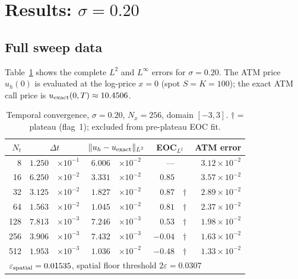 \documentclass[11pt,a4paper]{article}
\newcommand{\Nx}{N_x}
\newcommand{\Nt}{N_t}
\newcommand{\dt}{\Delta t}
\newcommand{\eps}{\varepsilon}
\begin{document}
\section{Results: \texorpdfstring{$\sigma = 0.20$}{sigma=0.20}}

\subsection{Full sweep data}

Table~\ref{tab:sigma020} shows the complete $L^2$ and
$L^\infty$ errors for $\sigma=0.20$.
The ATM price $u_h(0)$ is evaluated at the log-price $x=0$
(spot $S = K = 100$); the exact ATM call price is
$u_{\rm exact}(0,T) \approx 10.4506$.

\begin{table}[htbp]
\centering
\caption{Temporal convergence, $\sigma=0.20$, $\Nx=256$, domain $[-3,3]$.
  $\dagger$ = plateau (flag~1); excluded from pre-plateau EOC fit.}
\label{tab:sigma020}
\begin{tabular}{rr@{\;}lr@{\;}lr@{\;}lr}
\toprule
$\Nt$ & \multicolumn{2}{c}{$\dt$}
      & \multicolumn{2}{c}{$\|u_h - u_{\rm exact}\|_{L^2}$}
      & \multicolumn{2}{c}{EOC$_{L^2}$}
      & ATM error \\
\midrule
  8 & $1.250$&$\times 10^{-1}$ & $6.006$&$\times 10^{-2}$ & ---  & & $3.12\times10^{-2}$ \\
 16 & $6.250$&$\times 10^{-2}$ & $3.331$&$\times 10^{-2}$ & $0.85$ & & $3.57\times10^{-2}$ \\
 32 & $3.125$&$\times 10^{-2}$ & $1.827$&$\times 10^{-2}$ & $0.87$ &$\dagger$ & $2.89\times10^{-2}$ \\
 64 & $1.563$&$\times 10^{-2}$ & $1.045$&$\times 10^{-2}$ & $0.81$ &$\dagger$ & $2.37\times10^{-2}$ \\
128 & $7.813$&$\times 10^{-3}$ & $7.246$&$\times 10^{-3}$ & $0.53$ &$\dagger$ & $1.98\times10^{-2}$ \\
256 & $3.906$&$\times 10^{-3}$ & $7.432$&$\times 10^{-3}$ & $-0.04$ &$\dagger$ & $1.63\times10^{-2}$ \\
512 & $1.953$&$\times 10^{-3}$ & $1.036$&$\times 10^{-2}$ & $-0.48$ &$\dagger$ & $1.33\times10^{-2}$ \\
\midrule
\multicolumn{8}{l}{$\eps_{\rm spatial} = 0.01535$, spatial floor threshold $2\eps = 0.0307$} \\
\bottomrule
\end{tabular}
\end{table}
\end{document}
